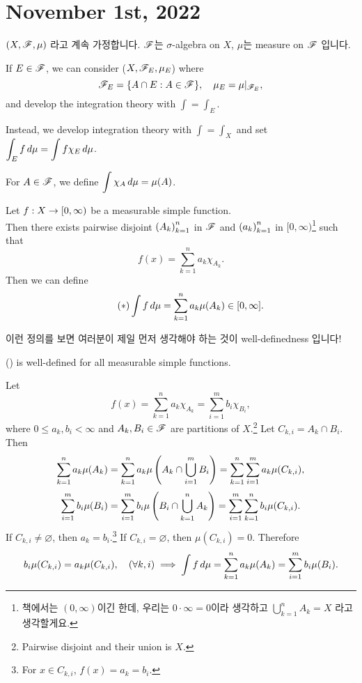 \section*{November 1st, 2022}

\((X, \mathscr{F}, \mu)\) 라고 계속 가정합니다. \(\mathscr{F}\)는 \(\sigma\)-algebra on \(X\), \(\mu\)는 measure on \(\mathscr{F}\) 입니다.

If \(E \in \mathscr{F}\), we can consider (\(X, \mathscr{F}_E, \mu_E\)) where
\[
    \mathscr{F}_E = \{A \cap E : A \in \mathscr{F}\}, \quad \mu_E = \mu|_{\mathscr{F}_E},
\]
and develop the integration theory with \(\int = \int_E\).

Instead, we develop integration theory with \(\int = \int_X\) and set \(\displaystyle \int_E f \,d{\mu} = \int f \chi _E \,d{\mu}\).

\medskip

 For \(A \in \mathscr{F}\), we define \(\displaystyle \int \chi_A \,d{\mu} = \mu(A)\).

 Let \(f: X \rightarrow [0, \infty)\) be a measurable simple function. \\
Then there exists pairwise disjoint \(\left( A_k \right)_{k=1}^n\) in \(\mathscr{F}\) and \(\left( a_k \right)_{k=1}^n\) in \([0, \infty)\)\footnote{책에서는 \((0, \infty)\)이긴 한데, 우리는 \(0 \cdot\infty = 0\)이라 생각하고 \(\bigcup_{k=1}^n A_k = X\) 라고 생각할게요.} such that
\[
    f(x) = \sum_{k=1}^n a_k \chi_{A_k}.
\]
Then we can define
\[ \tag{\mast}
    \int f\d{\mu} = \sum_{k=1}^n a_k \mu(A_k) \in [0, \infty].
\]

이런 정의를 보면 여러분이 제일 먼저 생각해야 하는 것이 well-definedness 입니다!

\rmk (\mast) is well-defined for all measurable simple functions.

\pf Let
\[
    f(x) = \sum_{k=1}^n a_k \chi_{A_k} = \sum_{i=1}^m b_i \chi_{B_i},
\]
where \(0\leq a_k, b_i < \infty\) and \(A_k, B_i \in \mathscr{F}\) are partitions of \(X\).\footnote{Pairwise disjoint and their union is \(X\).} Let \(C_{k, i} = A_k \cap B_i\). Then
\[
    \sum_{k=1}^n a_k \mu(A_k) = \sum_{k=1}^n a_k \mu\left( A_k \cap \bigcup_{i=1}^m B_i \right) = \sum_{k=1}^n \sum_{i=1}^m a_k \mu(C_{k, i}),
\]
\[
    \sum_{i=1}^m b_i \mu(B_i) = \sum_{i=1}^{m} b_i \mu\left( B_i \cap \bigcup_{k=1}^n A_k \right)= \sum_{i=1}^m \sum_{k=1}^n b_i \mu(C_{k, i}).
\]
If \(C_{k, i} \neq \varnothing\), then \(a_k = b_i\).\footnote{For \(x \in C_{k, i}\), \(f(x) = a_k = b_i\).} If \(C_{k, i} = \varnothing\), then \(\mu(C_{k, i}) = 0\). Therefore
\[
    b_i \mu(C_{k, i}) = a_k \mu(C_{k, i}), \quad (\forall k, i) \implies \int f \,d{\mu} = \sum_{k=1}^n a_k \mu(A_k) = \sum_{i=1}^m b_i \mu(B_i).
\]


